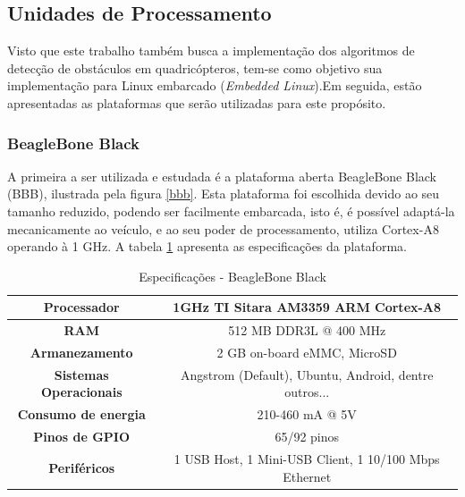 \subsection{Unidades de Processamento}

Visto que este trabalho também busca a implementação dos algoritmos de detecção de obstáculos em quadricópteros, tem-se como objetivo sua implementação para Linux embarcado (\textit{Embedded Linux}).Em seguida, estão apresentadas as plataformas que serão utilizadas para este propósito.


\subsubsection{BeagleBone Black}

A primeira a ser utilizada e estudada é a plataforma aberta BeagleBone Black (BBB), ilustrada pela figura \ref{bbb}. Esta plataforma foi escolhida devido ao seu tamanho reduzido, podendo ser facilmente embarcada, isto é, é possível adaptá-la mecanicamente ao veículo, e ao seu poder de processamento, utiliza Cortex-A8 operando à 1 GHz. A tabela \ref{bbb_tab} apresenta as especificações da plataforma.

\begin{table}[]
\centering
\caption{Especificações - BeagleBone Black}
\label{bbb_tab}
\begin{tabular}{|c|c|}
\hline
\textbf{Processador}           & 1GHz TI Sitara AM3359 ARM Cortex-A8			\\	\hline
\textbf{RAM}                   & 512 MB DDR3L @ 400 MHz					\\	\hline
\textbf{Armanezamento}         & 2 GB on-board eMMC, MicroSD				\\	\hline
\textbf{Sistemas Operacionais} & Angstrom (Default), Ubuntu, Android, dentre outros...	\\	\hline
\textbf{Consumo de energia}    & 210-460 mA @ 5V					\\	\hline
\textbf{Pinos de GPIO}         & 65/92 pinos						\\	\hline
\textbf{Periféricos}           & 1 USB Host, 1 Mini-USB Client, 1 10/100 Mbps Ethernet  \\	\hline                              
\end{tabular}
\end{table}

